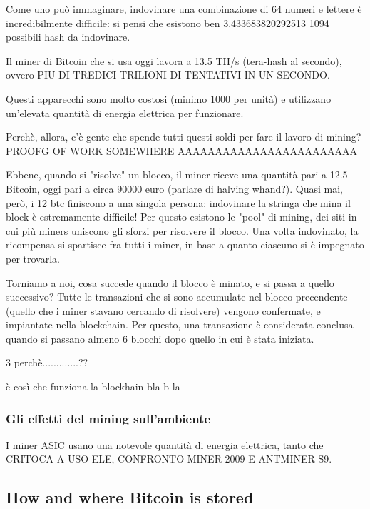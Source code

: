 \documentclass {article}
\begin{document}
Come uno può immaginare, indovinare una combinazione di 64 numeri e lettere è incredibilmente difficile: si pensi che esistono ben  3.433683820292513 1094 possibili hash da indovinare.

Il miner di Bitcoin che si usa oggi lavora a 13.5 TH/s (tera-hash al secondo), ovvero PIU DI TREDICI TRILIONI DI TENTATIVI IN UN SECONDO.

Questi apparecchi sono molto costosi (minimo 1000 per unità) e utilizzano un'elevata quantità di energia elettrica per funzionare.

Perchè, allora, c'è gente che spende tutti questi soldi per fare il lavoro di mining? PROOFG  OF WORK SOMEWHERE AAAAAAAAAAAAAAAAAAAAAAAA

Ebbene, quando si "risolve" un blocco, il miner riceve una quantità pari a 12.5 Bitcoin, oggi pari a circa 90000 euro (parlare di halving whand?). Quasi mai, però, i 12 btc finiscono a una singola persona: indovinare la stringa che mina il block è estremamente difficile! Per questo esistono le "pool" di mining, dei siti in cui più miners uniscono gli sforzi per risolvere il blocco. Una volta indovinato, la ricompensa si spartisce fra tutti i miner, in base a quanto ciascuno si è impegnato per trovarla.

Torniamo a noi, cosa succede quando il blocco è minato, e si passa a quello successivo? Tutte le transazioni che si sono accumulate nel blocco precendente (quello che i miner stavano cercando di risolvere) vengono confermate, e impiantate nella blockchain. Per questo, una transazione è considerata conclusa quando si passano almeno 6 blocchi dopo quello in cui è stata iniziata.

3 perchè.............??

è così che funziona la blockhain bla b la



\subsubsection {Gli effetti del mining sull'ambiente}



I miner ASIC usano una notevole quantità di energia elettrica, tanto che CRITOCA A USO ELE, %
CONFRONTO MINER 2009 E ANTMINER S9.



\subsection {How and where Bitcoin is stored}
\end{document}
